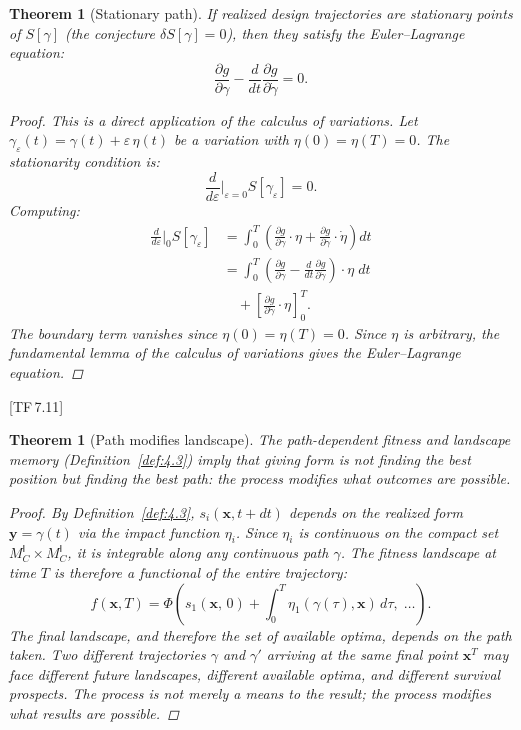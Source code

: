 \documentclass[10pt]{article}
\theoremstyle{definition}
\theoremstyle{plain}
\newtheorem{theorem}[definition]{Theorem}
\theoremstyle{remark}
\newcommand{\MC}{M^{\mathsf{I}}_C}          %
\newcommand{\TF}[1]{\textnormal{[TF\,#1]}}  %
\begin{document}
\begin{theorem}[Stationary path]\label{thm:8.2}
If realized design trajectories are stationary points of $S[\gamma]$
(the conjecture $\delta S[\gamma] = 0$), then they satisfy the
Euler--Lagrange equation:
\[
  \frac{\partial g}{\partial \gamma}
  - \frac{d}{dt}\frac{\partial g}{\partial \dot{\gamma}} = 0.
\]

\begin{proof}
This is a direct application of the calculus of variations. Let
$\gamma_\varepsilon(t) = \gamma(t) + \varepsilon \, \eta(t)$ be a
variation with $\eta(0) = \eta(T) = 0$. The stationarity condition is:
\[
  \frac{d}{d\varepsilon}\bigg|_{\varepsilon=0} S[\gamma_\varepsilon]
  = 0.
\]
Computing:
\begin{align*}
  \frac{d}{d\varepsilon}\bigg|_{0} S[\gamma_\varepsilon]
  &= \int_0^T \!\left(
    \frac{\partial g}{\partial \gamma} \cdot \eta
    + \frac{\partial g}{\partial \dot{\gamma}} \cdot \dot{\eta}
  \right) dt \\
  &= \int_0^T \!\left(
    \frac{\partial g}{\partial \gamma}
    - \frac{d}{dt}\frac{\partial g}{\partial \dot{\gamma}}
  \right) \cdot \eta \; dt\\
  &\quad+ \left[\frac{\partial g}{\partial \dot{\gamma}}
  \cdot \eta \right]_0^T.
\end{align*}
The boundary term vanishes since $\eta(0) = \eta(T) = 0$. Since $\eta$
is arbitrary, the fundamental lemma of the calculus of variations
gives the Euler--Lagrange equation. \qedhere
\end{proof}
\end{theorem}

\TF{7.11}

\begin{theorem}[Path modifies landscape]\label{thm:8.3}
The path-dependent fitness and landscape memory (Definition~\ref{def:4.3})
imply that giving form is not finding the best position but finding the
best \emph{path}: the process modifies what outcomes are possible.

\begin{proof}
By Definition~\ref{def:4.3}, $s_i(\bm{x}, t+dt)$ depends on the
realized form $\bm{y} = \gamma(t)$ via the impact function $\eta_i$.
Since $\eta_i$ is continuous on the compact set $\MC \times \MC$,
it is integrable along any continuous path $\gamma$.
The fitness landscape at time $T$ is therefore a functional of the
entire trajectory:
\[
  f(\bm{x}, T) = \Phi\!\left(
    s_1\!\left(\bm{x},\, 0\right) +
    \int_0^T \!\eta_1(\gamma(\tau), \bm{x})\, d\tau,\;
    \ldots
  \right).
\]
The final landscape, and therefore the set of available optima, depends
on the path taken. Two different trajectories $\gamma$ and $\gamma'$
arriving at the same final point $\bm{x}^T$ may face different future
landscapes, different available optima, and different survival
prospects. The process is not merely a means to the result; the process
\emph{modifies} what results are possible. \qedhere
\end{proof}
\end{theorem}
\end{document}
